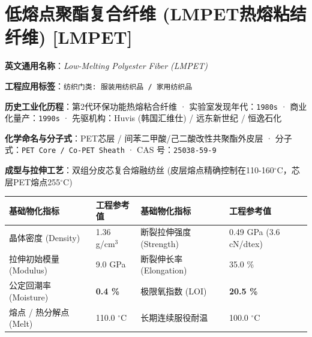 \documentclass[11pt,openright,twoside,UTF8]{ctexbook}
\begin{document}
\section{低熔点聚酯复合纤维 (LMPET热熔粘结纤维) [LMPET]}
\label{sec:lmpet}

\noindent\textbf{英文通用名称}：\textit{Low-Melting Polyester Fiber (LMPET)}\par
\noindent\textbf{工程应用标签}：\texttt{纺织门类: 服装用纺织品 / 家用纺织品}\par
\noindent\textbf{历史工业化历程}：第2代环保功能热熔粘合纤维 · 实验室发现年代：\texttt{1980s} · 商业化量产：\texttt{1990s} · 先驱机构：Huvis (韩国汇维仕) / 远东新世纪 / 恒逸石化\par
\noindent\textbf{化学命名与分子式}：PET芯层 / 间苯二甲酸/己二酸改性共聚酯外皮层 · 分子式：\texttt{PET Core / Co-PET Sheath} · CAS 号：\texttt{25038-59-9}\par
\noindent\textbf{成型与拉伸工艺}：双组分皮芯复合熔融纺丝 (皮层熔点精确控制在110-160$^\circ\mathrm{C}$，芯层PET熔点255$^\circ\mathrm{C}$)\par

\vspace{0.15cm}
\begin{center}
\small
\begin{tabularx}{\textwidth}{p{3.8cm}Xp{3.8cm}X}
\toprule
\textbf{基础物化指标} & \textbf{工程参考值} & \textbf{基础物化指标} & \textbf{工程参考值} \\
\midrule
晶体密度 (Density) & 1.36 g/cm$^3$ & 断裂拉伸强度 (Strength) & 0.49 GPa (3.6 cN/dtex) \\
拉伸初始模量 (Modulus) & 9.0 GPa & 断裂伸长率 (Elongation) & 35.0 \% \\
公定回潮率 (Moisture) & \textbf{0.4 \%} & 极限氧指数 (LOI) & \textbf{20.5 \%} \\
熔点 / 热分解点 (Melt) & 110.0 $^\circ\mathrm{C}$ & 长期连续服役耐温 & 100.0 $^\circ\mathrm{C}$ \\
\bottomrule
\end{tabularx}
\end{center}
\vspace{0.15cm}
\end{document}
